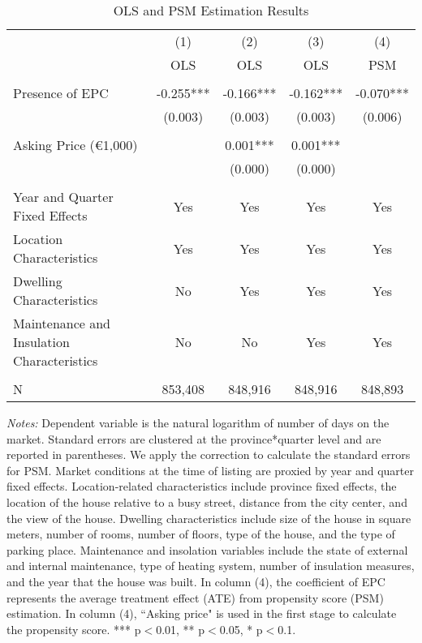 \documentclass[12pt]{article}
\begin{document}
\clearpage
\newpage
\begin{table}[H]
\footnotesize
  \centering
  \caption{OLS and PSM Estimation Results}
      \begin{tabular}{lcccc}
\hline
                &\multicolumn{1}{c}{(1)}&\multicolumn{1}{c}{(2)}&\multicolumn{1}{c}{(3)}&\multicolumn{1}{c}{(4)}\\
&OLS                     & OLS& OLS& PSM \\
\hline
&&&&\\
 Presence of EPC	 & -0.255*** & -0.166*** & -0.162***& -0.070***\\
& (0.003) & (0.003) & (0.003) & (0.006) \\
&&&&\\
Asking Price (\euro 1,000)	& & 	0.001***& 	0.001***& \\
& &  (0.000) & (0.000) & \\
&&&&\\
Year and Quarter Fixed Effects & Yes & Yes & Yes & Yes \\
Location Characteristics & Yes & Yes & Yes & Yes \\
Dwelling Characteristics & No & Yes & Yes & Yes \\
Maintenance and Insulation Characteristics & No & No & Yes & Yes \\
&&&&\\
N	& 853,408 &	848,916 &	848,916 &	848,893 \\
\hline

    \end{tabular}%
\begin{tablenotes}
\scriptsize
\item \textit{Notes:} Dependent variable is the natural logarithm of number of days on the market. Standard errors are clustered at the province*quarter level and are reported in parentheses. We apply the \citep{abadie2016matching} correction to calculate the standard errors for PSM. Market conditions at the time of listing are proxied by year and quarter fixed effects. Location-related characteristics include province fixed effects, the location of the house relative to a busy street, distance from the city center, and the view of the house. Dwelling characteristics include size of the house in square meters, number of rooms, number of floors, type of the house, and the type of parking place. Maintenance and insolation variables include the state of external and internal maintenance, type of heating system, number of insulation measures, and the year that the house was built. In column (4), the coefficient of EPC represents the average treatment effect (ATE) from propensity score (PSM) estimation. In column (4), ``Asking price" is used in the first stage to calculate the propensity score.   *** p$<$0.01, ** p$<$0.05, * p$<$0.1. 
\end{tablenotes}

  \label{tab:addlabel}%
\end{table}%
\end{document}
